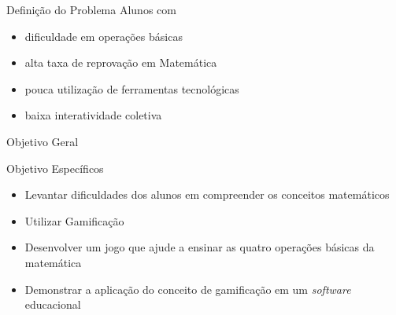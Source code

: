 \documentclass[13pt,xcolor=table]{beamer}
\begin{document}

\begin{frame} %
\end{frame}



\begin{frame}
	\begin{lamina}{Definição do Problema}
		Alunos com
		\begin{itemize}
			\item dificuldade em operações básicas
			\item alta taxa de reprovação em Matemática
			\item pouca utilização de ferramentas tecnológicas
			\item baixa interatividade coletiva
		\end{itemize}
	\end{lamina}
\end{frame}


\begin{frame}
	\begin{lamina}{Objetivo Geral}
		\vspace{3em}
	\end{lamina}
\end{frame}


\begin{frame}
	\begin{lamina}{Objetivo Específicos}
		\begin{itemize}
			\item Levantar dificuldades dos alunos em compreender os conceitos matemáticos
			\item Utilizar Gamificação
			\item Desenvolver um jogo que ajude a ensinar as quatro operações básicas da matemática
			\item Demonstrar a aplicação do conceito de gamificação em um {\it software} educacional
		\end{itemize}
	\end{lamina}
\end{frame}
\end{document}
